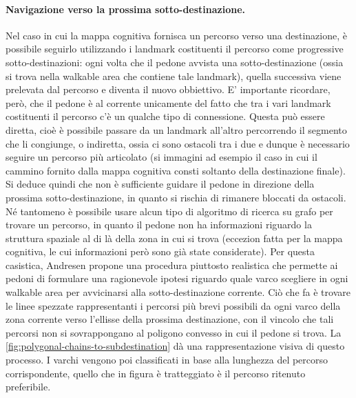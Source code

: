 \documentclass[12pt,a4paper,openright,oneside]{book}
\begin{document}
\paragraph{Navigazione verso la prossima sotto-destinazione.}\label{navigation-to-subdestination} Nel caso in cui la mappa cognitiva fornisca un percorso verso una destinazione, è possibile seguirlo utilizzando i landmark costituenti il percorso come progressive sotto-destinazioni: ogni volta che il pedone avvista una sotto-destinazione (ossia si trova nella walkable area che contiene tale landmark), quella successiva viene prelevata dal percorso e diventa il nuovo obbiettivo. E’ importante ricordare, però, che il pedone è al corrente unicamente del fatto che tra i vari landmark costituenti il percorso c’è un qualche tipo di connessione. Questa può essere diretta, cioè è possibile passare da un landmark all’altro percorrendo il segmento che li congiunge, o indiretta, ossia ci sono ostacoli tra i due e dunque è necessario seguire un percorso più articolato (si immagini ad esempio il caso in cui il cammino fornito dalla mappa cognitiva consti soltanto della destinazione finale). Si deduce quindi che non è sufficiente guidare il pedone in direzione della prossima sotto-destinazione, in quanto si rischia di rimanere bloccati da ostacoli. Né tantomeno è possibile usare alcun tipo di algoritmo di ricerca su grafo per trovare un percorso, in quanto il pedone non ha informazioni riguardo la struttura spaziale al di là della zona in cui si trova (eccezion fatta per la mappa cognitiva, le cui informazioni però sono già state considerate). Per questa casistica, Andresen \cite{Andresen2018} propone una procedura piuttosto realistica che permette ai pedoni di formulare una ragionevole ipotesi riguardo quale varco scegliere in ogni walkable area per avvicinarsi alla sotto-destinazione corrente. Ciò che fa è trovare le linee spezzate rappresentanti i percorsi più brevi possibili da ogni varco della zona corrente verso l’ellisse della prossima destinazione, con il vincolo che tali percorsi non si sovrappongano al poligono convesso in cui il pedone si trova. La \cref{fig:polygonal-chains-to-subdestination} dà una rappresentazione visiva di questo processo. I varchi vengono poi classificati in base alla lunghezza del percorso corrispondente, quello che in figura è tratteggiato è il percorso ritenuto preferibile.
\end{document}
